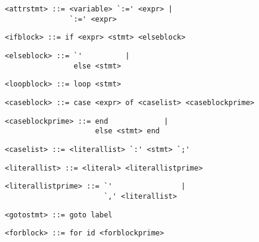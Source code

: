 \begin{footnotesize}
\begin{lstlisting}[frame=single, label={attrstmt}, language=pie]
<attrstmt> ::= <variable> `:=' <expr> |
               `:=' <expr>
\end{lstlisting}

\begin{lstlisting}[frame=single, label={ifblock}, language=pie]
<ifblock> ::= if <expr> <stmt> <elseblock>
\end{lstlisting}


\begin{lstlisting}[frame=single, label={elseblock}, language=pie]
<elseblock> ::= `'          |
                else <stmt>
\end{lstlisting}

\begin{lstlisting}[frame=single, label={loopblock}, language=pie]
<loopblock> ::= loop <stmt>
\end{lstlisting}

\begin{lstlisting}[frame=single, label={caseblock}, language=pie]
<caseblock> ::= case <expr> of <caselist> <caseblockprime>
\end{lstlisting}

\begin{lstlisting}[frame=single, label={caseblockprime}, language=pie]
<caseblockprime> ::= end             |
                     else <stmt> end
\end{lstlisting}

\begin{lstlisting}[frame=single, label={caselist}, language=pie]
<caselist> ::= <literallist> `:' <stmt> `;'
\end{lstlisting}

\begin{lstlisting}[frame=single, label={literallist}, language=pie]
<literallist> ::= <literal> <literallistprime>
\end{lstlisting}

\begin{lstlisting}[frame=single, label={literallistprime}, language=pie]
<literallistprime> ::= `'                |
                       `,' <literallist>
\end{lstlisting}

\begin{lstlisting}[frame=single, label={gotostmt}, language=pie]
<gotostmt> ::= goto label
\end{lstlisting}

\begin{lstlisting}[frame=single, label={forblock}, language=pie]
<forblock> ::= for id <forblockprime>
\end{lstlisting}


\end{footnotesize}
